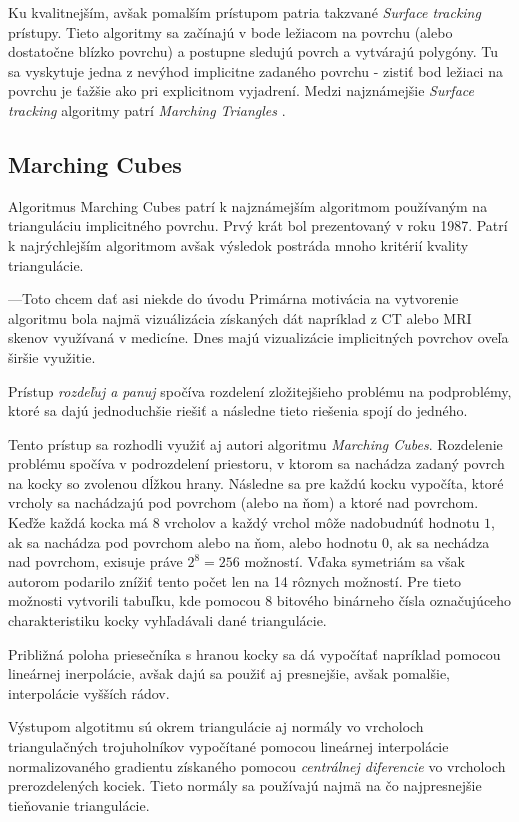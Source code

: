 Ku kvalitnejším, avšak pomalším prístupom patria takzvané \textit{Surface tracking} prístupy.
Tieto algoritmy sa začínajú v bode ležiacom na povrchu (alebo dostatočne blízko povrchu) a 
postupne sledujú povrch a vytvárajú polygóny. Tu sa vyskytuje jedna z nevýhod implicitne zadaného
povrchu - zistiť bod ležiaci na povrchu je ťažšie ako pri explicitnom vyjadrení. Medzi najznámejšie 
\textit{Surface tracking} algoritmy patrí \textit{Marching Triangles} \cite{hilton1996marching}.

\subsection{Marching Cubes}

Algoritmus Marching Cubes \cite{lorensen1987marching} patrí k najznámejším algoritmom používaným
na trianguláciu implicitného povrchu. Prvý krát bol prezentovaný v roku 1987. Patrí k najrýchlejším
algoritmom avšak výsledok postráda mnoho kritérií kvality triangulácie. 

---Toto chcem dať asi niekde do úvodu
Primárna motivácia na vytvorenie algoritmu bola najmä vizuálizácia získaných dát napríklad z CT alebo MRI skenov 
využívaná v medicíne. Dnes majú vizualizácie implicitných povrchov oveľa širšie využitie.

Prístup \textit{rozdeľuj a panuj} spočíva rozdelení zložitejšieho problému na podproblémy, 
ktoré sa dajú jednoduchšie riešiť a následne tieto riešenia spojí do jedného.

Tento prístup sa rozhodli využiť aj autori algoritmu \textit{Marching Cubes}. Rozdelenie problému
spočíva v podrozdelení priestoru, v ktorom sa nachádza zadaný povrch na kocky so zvolenou dĺžkou
hrany. Následne sa pre každú kocku vypočíta, ktoré vrcholy sa nachádzajú pod povrchom (alebo na ňom) 
a ktoré nad povrchom. Keďže každá kocka má 8 vrcholov a každý vrchol môže nadobudnúť hodnotu $1$, ak sa 
nachádza pod povrchom alebo na ňom, alebo hodnotu $0$, ak sa nechádza nad povrchom, exisuje práve 
$2^8 = 256$ možností. Vďaka symetriám sa však autorom podarilo znížiť tento počet len na 14 rôznych možností.
Pre tieto možnosti vytvorili tabuľku, kde pomocou 8 bitového binárneho čísla označujúceho charakteristiku
kocky vyhľadávali dané triangulácie.

Približná poloha priesečníka s hranou kocky sa dá vypočítať napríklad pomocou lineárnej inerpolácie, avšak 
dajú sa použiť aj presnejšie, avšak pomalšie, interpolácie vyšších rádov.

Výstupom algotitmu sú okrem triangulácie aj normály vo vrcholoch triangulačných trojuholníkov vypočítané pomocou lineárnej
interpolácie normalizovaného gradientu získaného pomocou \textit{centrálnej diferencie} vo vrcholoch prerozdelených kociek. 
Tieto normály sa používajú najmä na čo najpresnejšie tieňovanie triangulácie.


